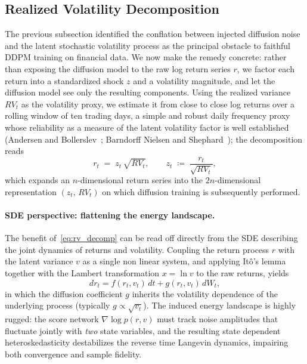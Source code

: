 \documentclass[sigconf,natbib=false]{acmart}
\begin{document}
\subsection{Realized Volatility Decomposition}

The previous subsection identified the conflation between injected diffusion noise and the latent stochastic volatility process as the principal obstacle to faithful DDPM training on financial data. We now make the remedy concrete: rather than exposing the diffusion model to the raw log return series $r$, we factor each return into a standardized shock $z$ and a volatility magnitude, and let the diffusion model see only the resulting components. Using the realized variance $RV_t$ as the volatility proxy, we estimate it from close to close log returns over a rolling window of ten trading days, a simple and robust daily frequency proxy whose reliability as a measure of the latent volatility factor is well established (Andersen and Bollerslev~\cite{andersen1998answering}; Barndorff Nielsen and Shephard~\cite{barndorff2002econometric}); the decomposition reads
\begin{equation}
    r_t \;=\; z_t \,\sqrt{RV_t}, \qquad z_t \;\coloneqq\; \frac{r_t}{\sqrt{RV_t}},
    \label{eq:rv_decomp}
\end{equation}
which expands an $n$-dimensional return series into the $2n$-dimensional representation $(z_t,\, RV_t)$ on which diffusion training is subsequently performed.

\paragraph{SDE perspective: flattening the energy landscape.}
The benefit of~\eqref{eq:rv_decomp} can be read off directly from the SDE describing the joint dynamics of returns and volatility. Coupling the return process $r$ with the latent variance $v$ as a single non linear system, and applying It\^{o}'s lemma together with the Lambert transformation $x = \ln v$ to the raw returns, yields
\begin{equation}
    dr_t = f(r_t, v_t)\, dt + g(r_t, v_t)\, dW_t,
\end{equation}
in which the diffusion coefficient $g$ inherits the volatility dependence of the underlying process (typically $g \propto \sqrt{v_t}$). The induced energy landscape is highly rugged: the score network $\nabla \log p(r, v)$ must track noise amplitudes that fluctuate jointly with \emph{two} state variables, and the resulting state dependent heteroskedasticity destabilizes the reverse time Langevin dynamics, impairing both convergence and sample fidelity.
\end{document}

